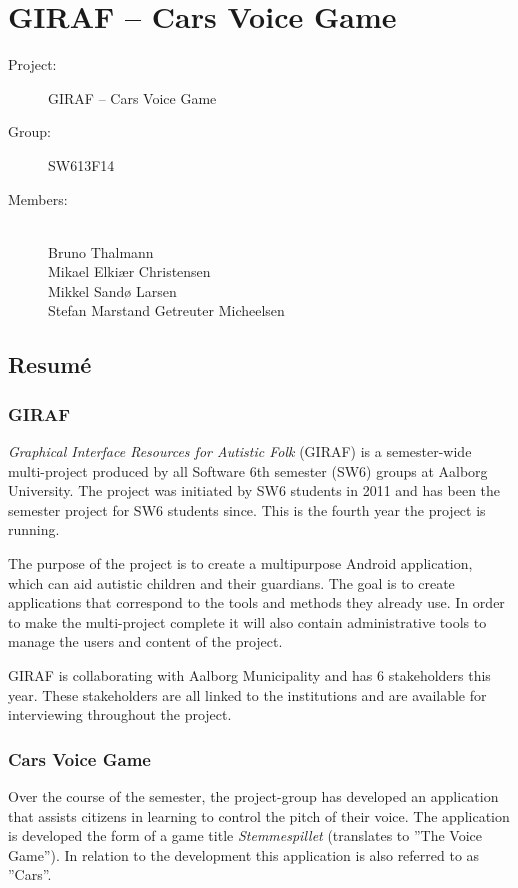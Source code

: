 \documentclass[a4paper,12pt,english]{article}
\begin{document}
\section*{GIRAF -- Cars Voice Game}

\begin{description}
\item[Project:] GIRAF -- Cars Voice Game
\item[Group:] SW613F14
\item[Members:] ~ \\
	Bruno Thalmann \\
	Mikael Elki\ae r Christensen \\
	Mikkel Sand\o{} Larsen \\
	Stefan Marstand Getreuter Micheelsen
\end{description}

\subsection*{Resum\'e}

\subsubsection*{GIRAF}
\textit{Graphical Interface Resources for Autistic Folk} (GIRAF) is a semester-wide multi-project produced by all Software 6th semester (SW6) groups at Aalborg University.
The project was initiated by SW6 students in 2011 and has been the semester project for SW6 students since.
This is the fourth year the project is running.

The purpose of the project is to create a multipurpose Android application, which can aid autistic children and their guardians.
The goal is to create applications that correspond to the tools and methods they already use.
In order to make the multi-project complete it will also contain administrative tools to manage the users and content of the project.

GIRAF is collaborating with Aalborg Municipality and has 6 stakeholders this year.
These stakeholders are all linked to the institutions and are available for interviewing throughout the project.

\subsubsection*{Cars Voice Game}
Over the course of the semester, the project-group has developed an application that assists citizens in learning to control the pitch of their voice.
The application is developed the form of a game title \textit{Stemmespillet} (translates to ''The Voice Game'').
In relation to the development this application is also referred to as ''Cars''.
\end{document}
